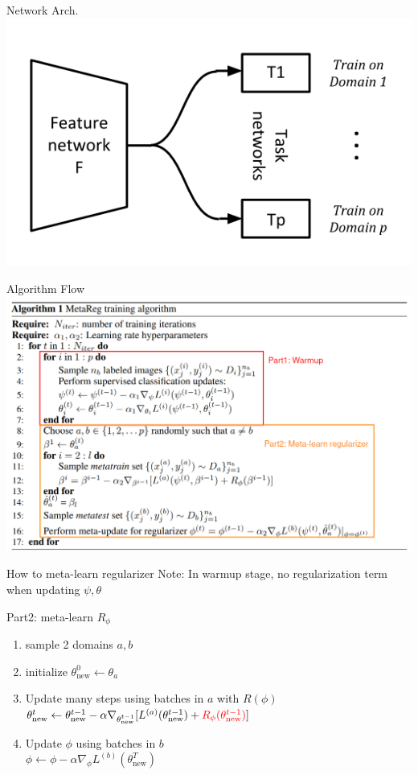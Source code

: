 \documentclass{beamer}
\begin{document}
\begin{frame}{Network Arch.}
  \includegraphics[width=\textwidth]{fig/meta-reg-arch.png}
\end{frame}

\begin{frame}{Algorithm Flow}
  \includegraphics[width=\textwidth]{fig/meta-reg-alg.png}
\end{frame}

\begin{frame}{How to meta-learn regularizer}
  Note: In warmup stage, no regularization term when updating $\psi, \theta$

  \begin{block}{Part2: meta-learn $R_\phi$}
    \begin{enumerate}
      \item sample 2 domains $a,b$
      \item initialize $\theta_{\text{new}}^0 \leftarrow \theta_a$
      \item Update many steps using batches in $a$ with $R(\phi)$\\
        $\theta_{\text{new}}^t \leftarrow \theta_{\text{new}}^{t-1} - \alpha \nabla_{\theta_{\text{new}}^{t-1}}[L^{(a)}(\theta_{\text{new}}^{t-1}) + {\color{red}{R_\phi}(\theta_{\text{new}}^{t-1})}]$
      \item Update $\phi$ using batches in $b$\\
        $\phi \leftarrow \phi - \alpha \nabla_\phi L^{(b)}(\theta^T_{\text{new}})$
    \end{enumerate}
  \end{block}
\end{frame}
\end{document}
